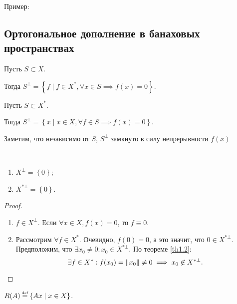 Пример: \todo

\subsection{Ортогональное дополнение в банаховых пространствах}


\begin{definition}
	Пусть $S \subset X$.

	Тогда $S^\bot = \left\{ f \mid f \in X^*, \forall x \in S \implies f(x) = 0 \right\}$.
\end{definition}

\begin{definition}
	Пусть $S \subset X^*$.

	 Тогда $S^\bot = \left\{ x \mid x \in X, \forall f \in S \implies f(x) = 0 \right\}$.
\end{definition}
Заметим, что независимо от $S$, $S^\bot$ замкнуто в силу непрерывности $f(x)$

\begin{statement} \ 
	\begin{enumerate}
		\item $X^\bot = \left\{ 0\right\}$;
		\item $X^{*\bot} = \left\{ 0\right\}$.
	\end{enumerate}
\end{statement}
\begin{proof}\ 
	\begin{enumerate}
		\item $f \in X^\bot$. Если $\forall x \in X, f(x) = 0 $, то $f \equiv 0$.
		\item Рассмотрим $\forall f \in X^*$. Очевидно, $f(0) = 0$, а это значит, что $0 \in X^{*\bot}$.
            Предположим, что $\exists x_0 \neq 0 : x_0 \in X^{*\bot}$.
            По теореме \ref{th1.2}:
            \[
                \exists f \in X^* : f(x_0) = \left\|x_0\right\| \neq 0 \implies x_0 \not\in X^{*\bot}\text{.} \qedhere
            \]
	\end{enumerate}
\end{proof}

\begin{definition}
	$R(A) \defeq \left\{ Ax \mid x \in X\right\}$.
\end{definition}

